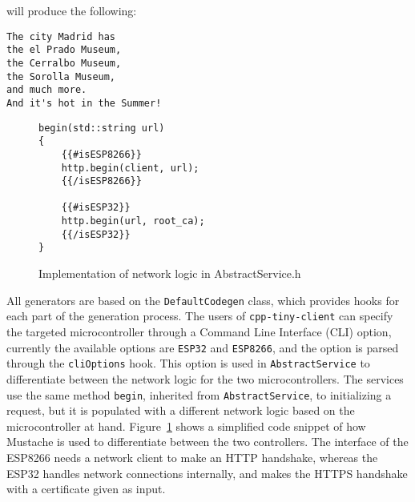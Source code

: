 \documentclass[manuscript,screen]{acmart}
\begin{document}
will produce the following: 

\begin{verbatim}
The city Madrid has
the el Prado Museum,
the Cerralbo Museum,
the Sorolla Museum,
and much more.
And it's hot in the Summer!
\end{verbatim}








\begin{figure}[b!]
\begin{verbatim}
begin(std::string url)
{
    {{#isESP8266}}
    http.begin(client, url);
    {{/isESP8266}}

    {{#isESP32}}
    http.begin(url, root_ca);
    {{/isESP32}}
}
\end{verbatim}
\caption{Implementation of network logic in AbstractService.h}
\label{fig:AbstractService}
\end{figure}

All generators are based on the \texttt{DefaultCodegen} class, which provides hooks for each part of the generation process. 
%
The users of \texttt{cpp-tiny-client} can specify the targeted microcontroller through a Command Line Interface (CLI) option, currently the available options are  \texttt{ESP32} and \texttt{ESP8266}, and the option is parsed through the \texttt{cliOptions} hook. 
%
This option is used in \texttt{AbstractService} to differentiate between the network logic for the two microcontrollers. The services use the same method \texttt{begin}, inherited from \texttt{AbstractService}, to initializing a request, but it is populated with a different network logic based on the microcontroller at hand. 
%
Figure~\ref{fig:AbstractService} shows a simplified code snippet of how Mustache is used to differentiate between the two controllers.  %
The interface of the ESP8266 needs a network client to make an HTTP handshake, whereas the ESP32 handles network connections internally, and makes the HTTPS handshake with a certificate given as input. 
\end{document}

